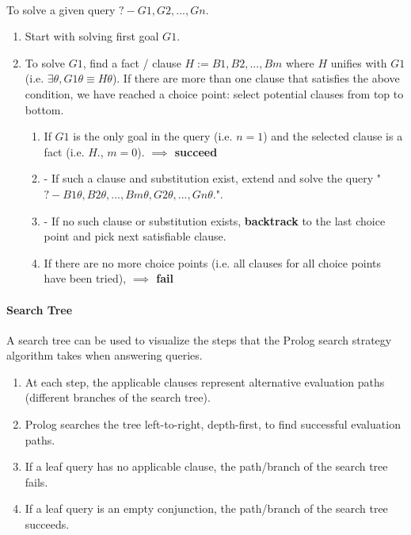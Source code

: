 \documentclass{article}
\begin{document}
\begin{multicols}{2}
  \paragraph{} To solve a given query $?- G1, G2, ..., Gn.$
  
  \begin{enumerate}
  \item Start with solving first goal $G1$.
  \item To solve $G1$, find a fact / clause $H := B1, B2, ..., Bm$ where $H$ unifies with $G1$ (i.e. $\exists\theta, G1\theta \equiv H\theta$). If there are more than one clause that satisfies the above condition, we have reached a choice point: select potential clauses from top to bottom. 
  \begin{enumerate}
  \item If $G1$ is the only goal in the query (i.e. $n=1$) and the selected clause is a fact (i.e. $H.$, $m=0$). {\bf $\implies$ succeed}
  \item - If such a clause and substitution exist, extend and solve the query "$?- B1\theta, B2\theta, ..., Bm\theta, G2\theta, ..., Gn\theta.$".
  \item - If no such clause or substitution exists, {\bf backtrack} to the last choice point and pick next satisfiable clause.
  \item If there are no more choice points (i.e. all clauses for all choice points have been tried), {\bf $\implies$ fail}
  \end{enumerate}
  \end{enumerate}
  
  \paragraph{Search Tree} A search tree can be used to visualize the steps that the Prolog search strategy algorithm takes when answering queries.
  
  \begin{enumerate}
  \item At each step, the applicable clauses represent alternative evaluation paths (different branches of the search tree).
  \item Prolog searches the tree left-to-right, depth-first, to find successful evaluation paths.
  \item If a leaf query has no applicable clause, the path/branch of the search tree fails.
  \item If a leaf query is an empty conjunction, the path/branch of the search tree succeeds.
  \end{enumerate}
  

\end{multicols}
\end{document}
